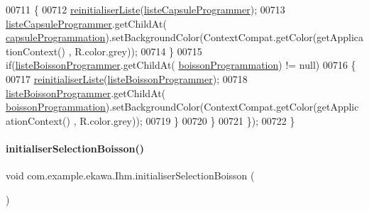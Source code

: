\begin{DoxyCode}
00711                 \{
00712                     \hyperlink{classcom_1_1example_1_1ekawa_1_1_ihm_a4c6ea5a7de9f8fc5c820fa4c8ce14838}{reinitialiserListe}(\hyperlink{classcom_1_1example_1_1ekawa_1_1_ihm_adfeb58df0ce9fa2088a7a708a54ffe07}{listeCapsuleProgrammer});
00713                     \hyperlink{classcom_1_1example_1_1ekawa_1_1_ihm_adfeb58df0ce9fa2088a7a708a54ffe07}{listeCapsuleProgrammer}.getChildAt(
      \hyperlink{classcom_1_1example_1_1ekawa_1_1_ihm_a2ddf5b95e2a3fbb3a15d160ba266295a}{capsuleProgrammation}).setBackgroundColor(ContextCompat.getColor(getApplicationContext()
      , R.color.grey));
00714                 \}
00715                 \textcolor{keywordflow}{if}(\hyperlink{classcom_1_1example_1_1ekawa_1_1_ihm_a8badf9f0485d205f8a379e54b01deab7}{listeBoissonProgrammer}.getChildAt(
      \hyperlink{classcom_1_1example_1_1ekawa_1_1_ihm_a6ad8136ec35fff9e96476c4f35726fea}{boissonProgrammation}) != null)
00716                 \{
00717                     \hyperlink{classcom_1_1example_1_1ekawa_1_1_ihm_a4c6ea5a7de9f8fc5c820fa4c8ce14838}{reinitialiserListe}(\hyperlink{classcom_1_1example_1_1ekawa_1_1_ihm_a8badf9f0485d205f8a379e54b01deab7}{listeBoissonProgrammer});
00718                     \hyperlink{classcom_1_1example_1_1ekawa_1_1_ihm_a8badf9f0485d205f8a379e54b01deab7}{listeBoissonProgrammer}.getChildAt(
      \hyperlink{classcom_1_1example_1_1ekawa_1_1_ihm_a6ad8136ec35fff9e96476c4f35726fea}{boissonProgrammation}).setBackgroundColor(ContextCompat.getColor(getApplicationContext()
      , R.color.grey));
00719                 \}
00720             \}
00721         \});
00722     \}
\end{DoxyCode}
\mbox{\label{classcom_1_1example_1_1ekawa_1_1_ihm_a0a4086cea2ee9d6d18c957513706cbce}} 
\paragraph{\texorpdfstring{initialiser\+Selection\+Boisson()}{initialiserSelectionBoisson()}}
{\footnotesize\ttfamily void com.\+example.\+ekawa.\+Ihm.\+initialiser\+Selection\+Boisson (\begin{DoxyParamCaption}{ }\end{DoxyParamCaption})\hspace{0.3cm}{\ttfamily [private]}}



